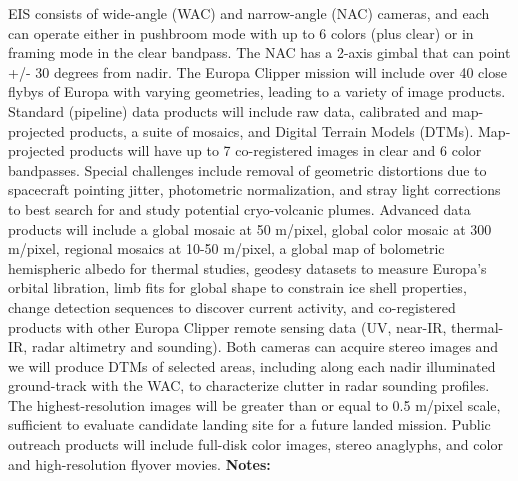 \documentclass{report}
\begin{document}
{{{{{{{{{{{{{{{{{{{{{{{{{{{{{{{{{{{{{{{{{{{{{{{{{{{{{{{{{{{{{{{{{{{{{{{{{{{{{{{{{{{{{{{{{{{{{{{{{{{{{{{{{{{{{{{{{{{{{{{{{{{{{{{{{{{{{{{{{{{{EIS consists of wide-angle (WAC) and narrow-angle (NAC) cameras, and each can operate either in pushbroom mode with up to 6 colors (plus clear) or in framing mode in the clear bandpass.  The NAC has a 2-axis gimbal that can point +/- 30 degrees from nadir.  The Europa Clipper mission will include over 40 close flybys of Europa with varying geometries, leading to a variety of image products.  Standard (pipeline) data products will include raw data, calibrated and map-projected products, a suite of mosaics, and Digital Terrain Models (DTMs).   Map-projected products will have up to 7 co-registered images in clear and 6 color bandpasses.  Special challenges include removal of geometric distortions due to spacecraft pointing jitter, photometric normalization,  and stray light corrections to best search for and study potential cryo-volcanic plumes.  Advanced data products will include a global mosaic at 50 m/pixel, global color mosaic at 300 m/pixel, regional mosaics at 10-50 m/pixel, a global map of bolometric hemispheric albedo for thermal studies, geodesy datasets to measure Europa’s orbital libration, limb fits for global shape to constrain ice shell properties, change detection sequences to discover current activity, and co-registered products with other Europa Clipper remote sensing data (UV, near-IR, thermal-IR, radar altimetry and sounding).   Both cameras can acquire stereo images and we will produce DTMs of selected areas, including along each nadir illuminated ground-track with the WAC, to characterize clutter in radar sounding profiles.  The highest-resolution images will be greater than or equal to 0.5 m/pixel scale, sufficient to evaluate candidate landing site for a future landed mission.  Public outreach products will include full-disk color images, stereo anaglyphs, and color and high-resolution flyover movies.\newline
{\bf Notes:}\newline
{\newpage
}}}}}}}}}}}}}}}}}}}}}}}}}}}}}}}}}}}}}}}}}}}}}}}}}}}}}}}}}}}}}}}}}}}}}}}}}}}}}}}}}}}}}}}}}}}}}}}}}}}}}}}}}}}}}}}}}}}}}}}}}}}}}}}}}}}}}}}}}}}}}
\end{document}
